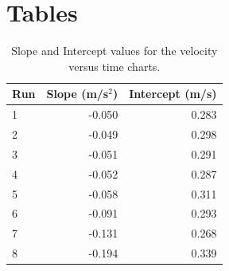 \section{Tables}
\begin{table}[ht]
    \centering
    \begin{tabular}{|l|r|r|}
        \hline
        \textbf{Run} & \textbf{Slope} (m/s$^{2}$) & \textbf{Intercept} (m/s) \\
        \hline
        1 & -0.050 & 0.283 \\
        2 & -0.049 & 0.298 \\
        3 & -0.051 & 0.291 \\
        4 & -0.052 & 0.287 \\
        5 & -0.058 & 0.311 \\
        6 & -0.091 & 0.293 \\
        7 & -0.131 & 0.268 \\
        8 & -0.194 & 0.339 \\
        \hline
    \end{tabular}
    \caption{Slope and Intercept values for the velocity versus time charts.}
    \label{table:03.results}
\end{table}
\FloatBarrier
\newpage
